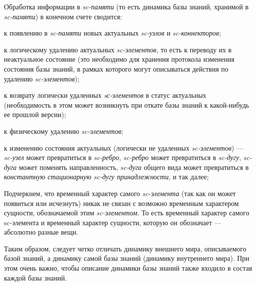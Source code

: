 Обработка информации в \textit{sc-памяти} (то есть динамика базы знаний, хранимой в \textit{sc-памяти}) в конечном счете сводится:
\begin{textitemize}
	\item к появлению в \textit{sc-памяти} новых актуальных \textit{sc-узлов} и \textit{sc-коннекторов};
	\item к логическому удалению актуальных \textit{sc-элементов}, то есть к переводу их в неактуальное состояние (это необходимо для хранения протокола изменения состояния базы знаний, в рамках которого могут описываться действия по удалению \textit{sc-элементов});
	\item к возврату логически удаленных \textit{sс-элементов} в статус актуальных (необходимость в этом может возникнуть при откате базы знаний к какой-нибудь ее прошлой версии);
	\item к физическому удалению \textit{sc-элементов};
	\item к изменению состояния актуальных (логически не удаленных \textit{sc-элементов}) --- \textit{sc-узел} может превратиться в \textit{sc-ребро}, \textit{sc-ребро} может превратиться в \textit{sc-дугу}, \textit{sc-дуга} может поменять направленность, \textit{sc-дуга} общего вида может превратиться в \textit{константную стационарную sc-дугу принадлежности}, и так далее;
\end{textitemize}

Подчеркнем, что временный характер самого \textit{sc-элемента} (так как он может появиться или исчезнуть) никак не связан с возможно временным характером сущности, обозначаемой этим \textit{sc-элементом}. То есть временный характер самого sc-элемента и временный характер сущности, которую он обозначает --- абсолютно разные вещи.

Таким образом, следует четко отличать динамику внешнего мира, описываемого базой знаний, а динамику самой базы знаний (динамику внутреннего мира). При этом очень важно, чтобы описание динамики базы знаний также входило в состав каждой базы знаний.

